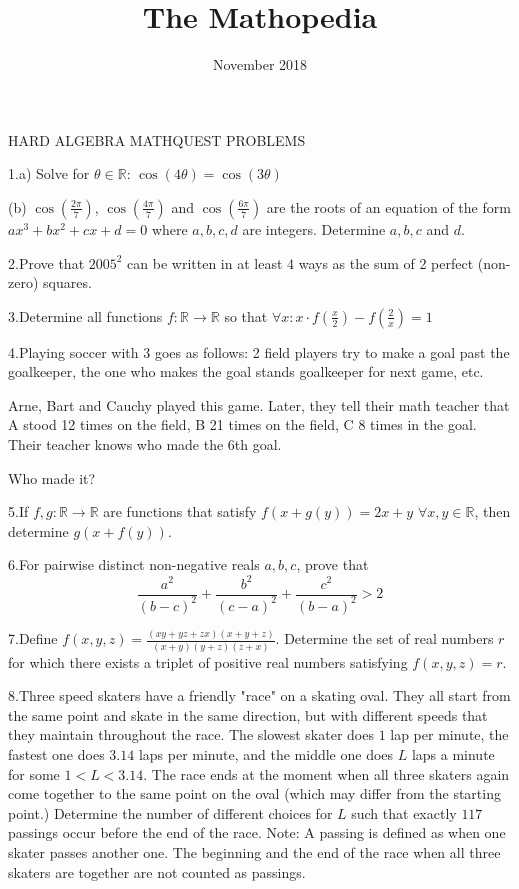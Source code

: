 \documentclass{article}
\begin{document}
\title{The Mathopedia}
\author{}
\date{November 2018}
\maketitle









HARD ALGEBRA MATHQUEST PROBLEMS
 
1.a) Solve for $\theta\in\mathbb{R}$: $\cos(4\theta) = \cos(3\theta)$

(b) $\cos\left(\frac{2\pi}{7}\right)$, $\cos\left(\frac{4\pi}{7}\right)$ and $\cos\left(\frac{6\pi}{7}\right)$ are the roots of an equation of the form $ax^3+bx^2+cx+d = 0$ where $a, b, c, d$ are integers. Determine $a, b, c$ and $d$.

2.Prove that $2005^2$ can be written in at least $4$ ways as the sum of 2 perfect (non-zero) squares.

3.Determine all functions $f: \mathbb{R}\rightarrow\mathbb{R}$ so that $\forall x: x\cdot f(\frac x 2) - f(\frac 2 x) = 1$

4.Playing soccer with 3 goes as follows: 2 field players try to make a goal past the goalkeeper, the one who makes the goal stands goalkeeper for next game, etc.

Arne, Bart and Cauchy played this game. Later, they tell their math teacher that A stood 12 times on the field, B 21 times on the field, C 8 times in the goal. Their teacher knows who made the 6th goal.

Who made it?

5.If $f,g: \mathbb{R} \to \mathbb{R}$ are functions that satisfy $f(x+g(y)) = 2x+y $ $\forall x,y \in \mathbb{R}$, then determine $g(x+f(y))$.

6.For pairwise distinct non-negative reals $a,b,c$, prove that
$$\frac{a^2}{(b-c)^2}+\frac{b^2}{(c-a)^2}+\frac{c^2}{(b-a)^2}>2$$

7.Define $f(x,y,z)=\frac{(xy+yz+zx)(x+y+z)}{(x+y)(y+z)(z+x)}$.
Determine the set of real numbers $r$ for which there exists a triplet of positive real numbers satisfying $f(x,y,z)=r$.

8.Three speed skaters have a friendly "race" on a skating oval. They all start from the same point and skate in the same direction, but with different speeds that they maintain throughout the race. The slowest skater does $1$ lap per minute, the fastest one does $3.14$ laps per minute, and the middle one does $L$ laps a minute for some $1 < L < 3.14$. The race ends at the moment when all three skaters again come together to the same point on the oval (which may differ from the starting point.) Determine the number of different choices for $L$ such that exactly $117$ passings occur before the end of the race.
Note: A passing is defined as when one skater passes another one. The beginning and the end of the race when all three skaters are together are not counted as passings.
\end{document}
